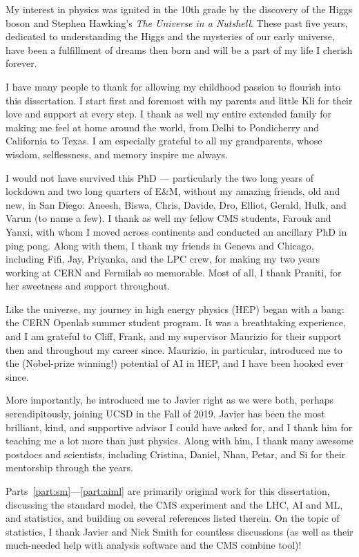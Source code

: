 My interest in physics was ignited in the 10th grade by the discovery of the Higgs boson and Stephen Hawking's \textit{The Universe in a Nutshell}.
These past five years, dedicated to understanding the Higgs and the mysteries of our early universe, have been a fulfillment of dreams then born and will be a part of my life I cherish forever.

I have many people to thank for allowing my childhood passion to flourish into this dissertation.
I start first and foremost with my parents and little Kli for their love and support at every step.
I thank as well my entire extended family for making me feel at home around the world, from Delhi to Pondicherry and California to Texas.
I am especially grateful to all my grandparents, whose wisdom, selflessness, and memory inspire me always.

I would not have survived this PhD --- particularly the two long years of lockdown and two long quarters of E\&M, without my amazing friends, old and new, in San Diego: Aneesh, Biswa, Chris, Davide, Dro, Elliot, Gerald, Hulk, and Varun (to name a few).
I thank as well my fellow CMS students, Farouk and Yanxi, with whom I moved across continents and conducted an ancillary PhD in ping pong.
Along with them, I thank my friends in Geneva and Chicago, including Fifi, Jay, Priyanka, and the LPC crew, for making my two years working at CERN and Fermilab so memorable.
Most of all, I thank Praniti, for her sweetness and support throughout.

Like the universe, my journey in high energy physics (HEP) began with a bang: the CERN Openlab summer student program.
It was a breathtaking experience, and I am grateful to Cliff, Frank, and my supervisor Maurizio for their support then and throughout my career since.
Maurizio, in particular, introduced me to the (Nobel-prize winning!) potential of AI in HEP, and I have been hooked ever since.

More importantly, he introduced me to Javier right as we were both, perhaps serendipitously, joining UCSD in the Fall of 2019.
Javier has been the most brilliant, kind, and supportive advisor I could have asked for, and I thank him for teaching me a lot more than just physics.
Along with him, I thank many awesome postdocs and scientists, including Cristina, Daniel, Nhan, Petar, and Si for their mentorship through the years.

Parts~\ref{part:sm}---\ref{part:aiml} are primarily original work for this dissertation, discussing the standard model, the CMS experiment and the LHC, AI and ML, and statistics, and building on several references listed therein.
On the topic of statistics, I thank Javier and Nick Smith for countless discussions (as well as their much-needed help with analysis software and the CMS combine tool)!

